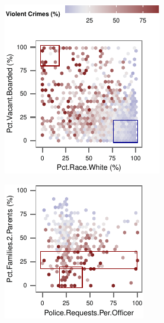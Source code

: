 \begin{figure}[t!]
    \centering
    \begin{subfigure}[b]{0.45\columnwidth}
    \includegraphics[width=\textwidth]{plots/crime1}
    \end{subfigure}
    \begin{subfigure}[b]{0.45\columnwidth}
    \includegraphics[width=\textwidth]{plots/crime2}
    \end{subfigure}


\end{figure}
